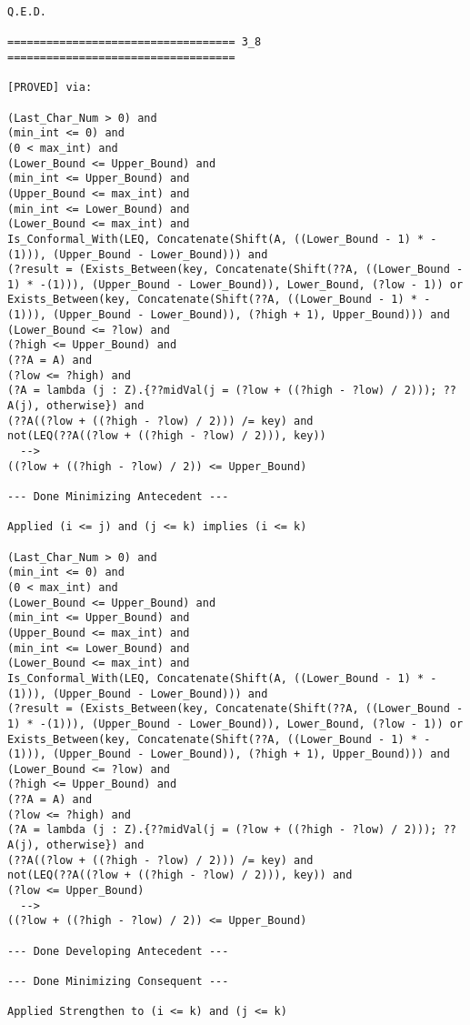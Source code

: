 \begin{lstlisting}[language=resolve]
Q.E.D.

=================================== 3_8 ===================================

[PROVED] via:

(Last_Char_Num > 0) and
(min_int <= 0) and
(0 < max_int) and
(Lower_Bound <= Upper_Bound) and
(min_int <= Upper_Bound) and
(Upper_Bound <= max_int) and
(min_int <= Lower_Bound) and
(Lower_Bound <= max_int) and
Is_Conformal_With(LEQ, Concatenate(Shift(A, ((Lower_Bound - 1) * -(1))), (Upper_Bound - Lower_Bound))) and
(?result = (Exists_Between(key, Concatenate(Shift(??A, ((Lower_Bound - 1) * -(1))), (Upper_Bound - Lower_Bound)), Lower_Bound, (?low - 1)) or Exists_Between(key, Concatenate(Shift(??A, ((Lower_Bound - 1) * -(1))), (Upper_Bound - Lower_Bound)), (?high + 1), Upper_Bound))) and
(Lower_Bound <= ?low) and
(?high <= Upper_Bound) and
(??A = A) and
(?low <= ?high) and
(?A = lambda (j : Z).{??midVal(j = (?low + ((?high - ?low) / 2))); ??A(j), otherwise}) and
(??A((?low + ((?high - ?low) / 2))) /= key) and
not(LEQ(??A((?low + ((?high - ?low) / 2))), key))
  -->
((?low + ((?high - ?low) / 2)) <= Upper_Bound)

--- Done Minimizing Antecedent ---

Applied (i <= j) and (j <= k) implies (i <= k)

(Last_Char_Num > 0) and
(min_int <= 0) and
(0 < max_int) and
(Lower_Bound <= Upper_Bound) and
(min_int <= Upper_Bound) and
(Upper_Bound <= max_int) and
(min_int <= Lower_Bound) and
(Lower_Bound <= max_int) and
Is_Conformal_With(LEQ, Concatenate(Shift(A, ((Lower_Bound - 1) * -(1))), (Upper_Bound - Lower_Bound))) and
(?result = (Exists_Between(key, Concatenate(Shift(??A, ((Lower_Bound - 1) * -(1))), (Upper_Bound - Lower_Bound)), Lower_Bound, (?low - 1)) or Exists_Between(key, Concatenate(Shift(??A, ((Lower_Bound - 1) * -(1))), (Upper_Bound - Lower_Bound)), (?high + 1), Upper_Bound))) and
(Lower_Bound <= ?low) and
(?high <= Upper_Bound) and
(??A = A) and
(?low <= ?high) and
(?A = lambda (j : Z).{??midVal(j = (?low + ((?high - ?low) / 2))); ??A(j), otherwise}) and
(??A((?low + ((?high - ?low) / 2))) /= key) and
not(LEQ(??A((?low + ((?high - ?low) / 2))), key)) and
(?low <= Upper_Bound)
  -->
((?low + ((?high - ?low) / 2)) <= Upper_Bound)

--- Done Developing Antecedent ---

--- Done Minimizing Consequent ---

Applied Strengthen to (i <= k) and (j <= k)


\end{lstlisting}
